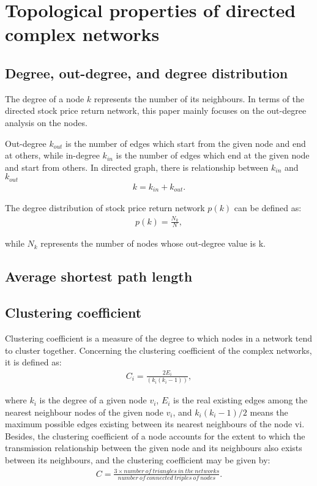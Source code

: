 \chapter[Network Topological properties]{Topological properties of directed complex networks}
\section{Degree, out-degree, and degree distribution}
The degree of a node $k$ represents the number of its neighbours. In terms of the directed stock price return network, this paper mainly focuses on the out-degree analysis on the nodes.

Out-degree $k_{out}$ is the number of edges which start from the given node and end at others, while in-degree $k_{in}$ is the number of edges which end at the given node and start from others. In directed graph, there is relationship between $k_{in}$ and $k_{out}$
\begin{eqnarray}
k=k_{in}+k_{out}.
\end{eqnarray}

The degree distribution of stock price return network $p(k)$ can be defined as:
\begin{eqnarray}
p(k)=\frac{N_k}{N},
\end{eqnarray}

while $N_k$ represents the number of nodes whose out-degree value is k.

\section{Average shortest path length}

\section{Clustering coefficient} %
Clustering coefficient is a measure of the degree to which nodes in a network tend to cluster together. Concerning the clustering coefficient of the complex networks, it is defined as:
\begin{eqnarray}
C_i=\frac{2E_i}{(k_i(k_i-1))},
\end{eqnarray}

where $k_i$ is the degree of a given node $v_i$, $E_i$ is the real existing edges among the nearest neighbour nodes of the given node $v_i$, and $k_i(k_i-1)/2$ means the maximum possible edges existing between its nearest neighbours of the node vi. Besides, the clustering coefficient of a node accounts for the extent to which the transmission relationship between the given node and its neighbours also exists between its neighbours, and the clustering coefficient may be given by:
\begin{eqnarray}
C=\frac{3\times number\ of\ triangles\ in\ the\ networks}{number\ of\ connected\ triples\ of\ nodes}.
\end{eqnarray}

